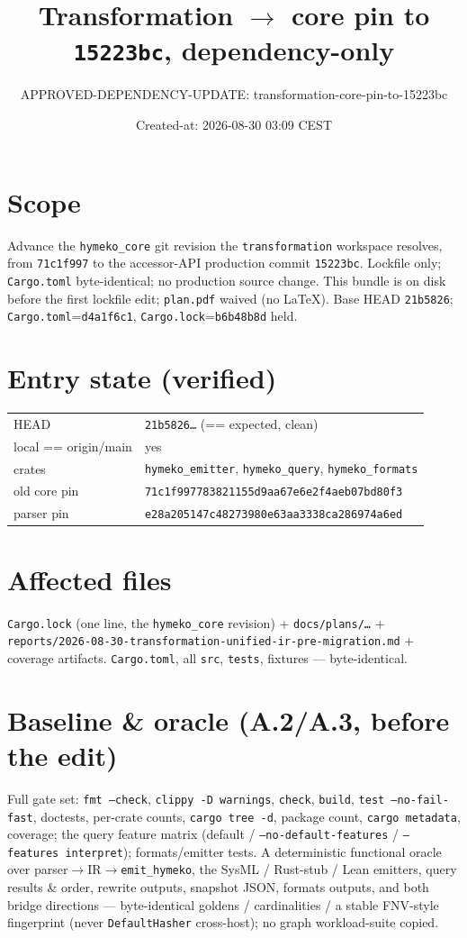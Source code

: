 \documentclass[11pt]{article}
\title{Transformation $\rightarrow$ core pin to \texttt{15223bc}, dependency-only}
\author{APPROVED-DEPENDENCY-UPDATE: transformation-core-pin-to-15223bc}
\date{Created-at: 2026-08-30 03:09 CEST}
\begin{document}
\maketitle

\section*{Scope}
Advance the \texttt{hymeko\_core} git revision the \texttt{transformation}
workspace resolves, from \texttt{71c1f997} to the accessor-API production commit
\texttt{15223bc}. Lockfile only; \texttt{Cargo.toml} byte-identical; no production
source change. This bundle is on disk before the first lockfile edit;
\texttt{plan.pdf} waived (no LaTeX). Base HEAD \texttt{21b5826};
\texttt{Cargo.toml}=\texttt{d4a1f6c1}, \texttt{Cargo.lock}=\texttt{b6b48b8d} held.

\section{Entry state (verified)}
\begin{longtable}{ll}
\toprule
HEAD & \texttt{21b5826…} (== expected, clean) \\
local == origin/main & yes \\
crates & \texttt{hymeko\_emitter}, \texttt{hymeko\_query}, \texttt{hymeko\_formats} \\
old core pin & \texttt{71c1f997783821155d9aa67e6e2f4aeb07bd80f3} \\
parser pin & \texttt{e28a205147c48273980e63aa3338ca286974a6ed} \\
\bottomrule
\end{longtable}

\section{Affected files}
\texttt{Cargo.lock} (one line, the \texttt{hymeko\_core} revision) +
\texttt{docs/plans/…} + \texttt{reports/2026-08-30-transformation-unified-ir-pre-migration.md}
+ coverage artifacts. \texttt{Cargo.toml}, all \texttt{src}, \texttt{tests},
fixtures --- byte-identical.

\section{Baseline \& oracle (A.2/A.3, before the edit)}
Full gate set: \texttt{fmt --check}, \texttt{clippy -D warnings}, \texttt{check},
\texttt{build}, \texttt{test --no-fail-fast}, doctests, per-crate counts,
\texttt{cargo tree -d}, package count, \texttt{cargo metadata}, coverage; the
query feature matrix (default / \texttt{--no-default-features} /
\texttt{--features interpret}); formats/emitter tests. A deterministic functional
oracle over parser$\to$IR$\to$\texttt{emit\_hymeko}, the SysML / Rust-stub / Lean
emitters, query results \& order, rewrite outputs, snapshot JSON, formats outputs,
and both bridge directions --- byte-identical goldens / cardinalities / a stable
FNV-style fingerprint (never \texttt{DefaultHasher} cross-host); no graph
workload-suite copied.
\end{document}
